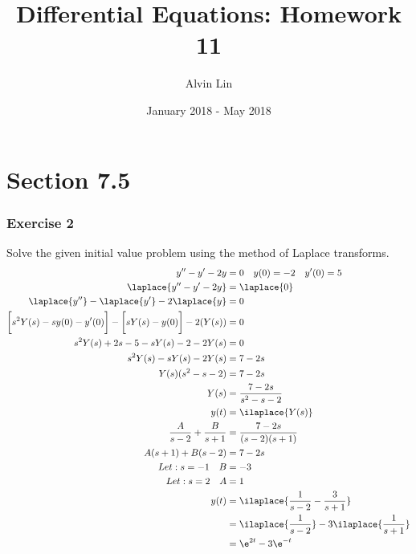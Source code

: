 \documentclass{math}
\title{Differential Equations: Homework 11}
\author{Alvin Lin}
\date{January 2018 - May 2018}
\begin{document}
\maketitle
\clearpage

\section*{Section 7.5}

\subsubsection*{Exercise 2}
Solve the given initial value problem using the method of Laplace transforms.
\begin{align*}
  y''-y'-2y &= 0 \quad y(0) = -2 \quad y'(0) = 5 \\
  \laplace{y''-y'-2y} &= \laplace{0} \\
  \laplace{y''}-\laplace{y'}-2\laplace{y} &= 0 \\
  \bigg[s^2Y(s)-sy(0)-y'(0)\bigg]-\bigg[sY(s)-y(0)\bigg]-2(Y(s)) &= 0 \\
  s^2Y(s)+2s-5-sY(s)-2-2Y(s) &= 0 \\
  s^2Y(s)-sY(s)-2Y(s) &= 7-2s \\
  Y(s)(s^2-s-2) &= 7-2s \\
  Y(s) &= \frac{7-2s}{s^2-s-2} \\
  y(t) &= \ilaplace{Y(s)} \\
  \frac{A}{s-2}+\frac{B}{s+1} &= \frac{7-2s}{(s-2)(s+1)} \\
  A(s+1)+B(s-2) &= 7-2s \\
  Let: s = -1 \quad B &= -3 \\
  Let: s = 2 \quad A &= 1 \\
  y(t) &= \ilaplace{\frac{1}{s-2}-\frac{3}{s+1}} \\
  &= \ilaplace{\frac{1}{s-2}}-3\ilaplace{\frac{1}{s+1}} \\
  &= \e^{2t}-3\e^{-t}
\end{align*}
\end{document}
